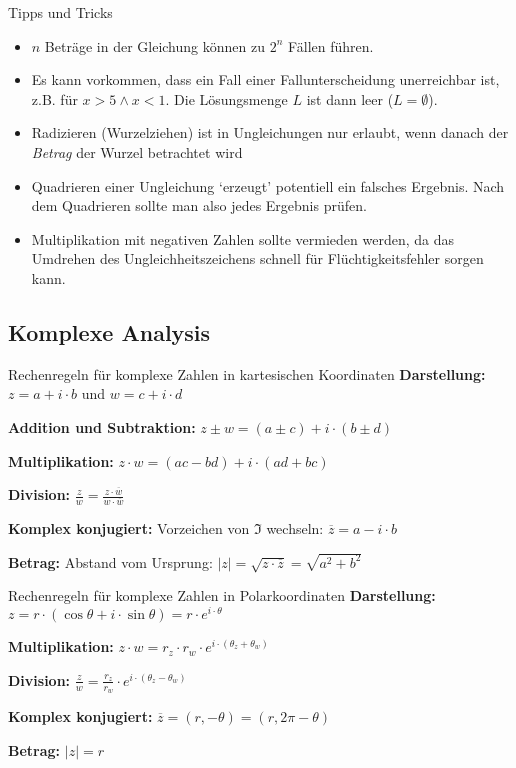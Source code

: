 \documentclass[german]{../spicker}
\renewcommand{\abs}[1]{\left| #1 \right|}
\begin{document}
\begin{bonus}{Tipps und Tricks}
    \begin{itemize}
        \item $n$ Beträge in der Gleichung können zu $2^n$ Fällen führen.
        \item Es kann vorkommen, dass ein Fall einer Fallunterscheidung unerreichbar ist, z.B. für $x > 5 \land x < 1$. Die Lösungsmenge $L$ ist dann leer ($L = \emptyset$).
        \item Radizieren (Wurzelziehen) ist in Ungleichungen nur erlaubt, wenn danach der \emph{Betrag} der Wurzel betrachtet wird
        \item Quadrieren einer Ungleichung `erzeugt' potentiell ein falsches Ergebnis. Nach dem Quadrieren sollte man also jedes Ergebnis prüfen.
        \item Multiplikation mit negativen Zahlen sollte vermieden werden, da das Umdrehen des Ungleichheitszeichens schnell für Flüchtigkeitsfehler sorgen kann.
    \end{itemize}
\end{bonus}

\subsection{Komplexe Analysis}
\begin{bonus}{Rechenregeln für komplexe Zahlen in kartesischen Koordinaten}
    \textbf{Darstellung:} $z = a + i \cdot b$ und $w = c + i \cdot d$

    \textbf{Addition und Subtraktion:} $z \pm w = (a\pm c) + i \cdot (b \pm d)$

    \textbf{Multiplikation:} $z \cdot w = (ac -bd) + i \cdot (ad + bc)$

    \textbf{Division:} $\frac{z}{w} = \frac{z \cdot \overline{w}}{w \cdot \overline{w}}$

    \textbf{Komplex konjugiert:} Vorzeichen von $\Im$ wechseln: $\overline{z} = a- i \cdot b$

    \textbf{Betrag:} Abstand vom Ursprung: $\abs{z} = \sqrt{z \cdot \overline{z}} = \sqrt{a^2 + b^2}$
\end{bonus}

\begin{bonus}{Rechenregeln für komplexe Zahlen in Polarkoordinaten}
    \textbf{Darstellung:} $z = r \cdot (\cos\theta + i \cdot \sin \theta) = r \cdot e^{i \cdot \theta}$

    \textbf{Multiplikation:} $z \cdot w = r_z \cdot r_w \cdot e^{i \cdot (\theta_z + \theta_w)}$

    \textbf{Division:} $\frac{z}{w} = \frac{r_z}{r_w} \cdot e^{i \cdot (\theta_z - \theta_w)}$

    \textbf{Komplex konjugiert:} $\overline{z} = (r, -\theta) = (r, 2\pi - \theta)$

    \textbf{Betrag:} $\abs{z} = r$
\end{bonus}
\end{document}
